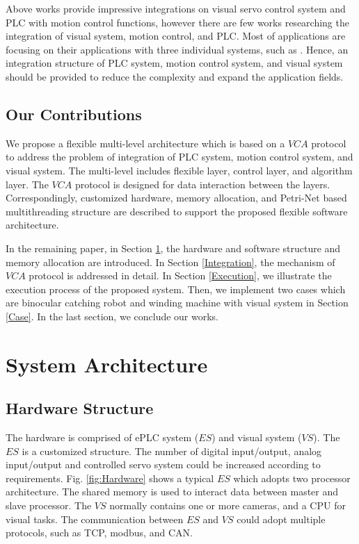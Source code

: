 \documentclass[journal,UTF8]{IEEEtran}
\begin{document}
Above works provide impressive integrations on visual servo control system and PLC with motion control functions, however there are few works researching the integration of visual system, motion control, and PLC. Most of applications are focusing on their applications with three individual systems, such as \cite{Chen2014A}. Hence, an integration structure of PLC system, motion control system, and visual system should be provided to reduce the complexity and expand the application fields.

\subsection{Our Contributions}
We propose a flexible multi-level architecture which is based on a $VCA$ protocol to address the problem of integration of PLC system, motion control system, and visual system. The multi-level includes flexible layer, control layer, and algorithm layer. The $VCA$ protocol is designed for data interaction between the layers. Correspondingly, customized hardware, memory allocation, and Petri-Net based multithreading structure are described to support the proposed flexible software architecture.

In the remaining paper, in Section \ref{SystemStructure}, the hardware and software structure and memory allocation are introduced. In Section \ref{Integration}, the mechanism of $VCA$ protocol is addressed in detail. In Section \ref{Execution}, we illustrate the execution process of the proposed system. Then, we implement two cases which are binocular catching robot and winding machine with visual system in Section \ref{Case}. In the last section, we conclude our works.

\section{System Architecture}
\label{SystemStructure}
\subsection{Hardware Structure}
The hardware is comprised of ePLC system ($ES$) and visual system ($VS$). The $ES$ is a customized structure. The number of digital input/output, analog input/output and controlled servo system could be increased according to requirements. Fig. \ref{fig:Hardware} shows a typical $ES$ which adopts two processor architecture. The shared memory is used to interact data between master and slave processor. The $VS$ normally contains one or more cameras, and a CPU for visual tasks. The communication between $ES$ and $VS$ could adopt multiple protocols, such as TCP, modbus, and CAN.
\end{document}

